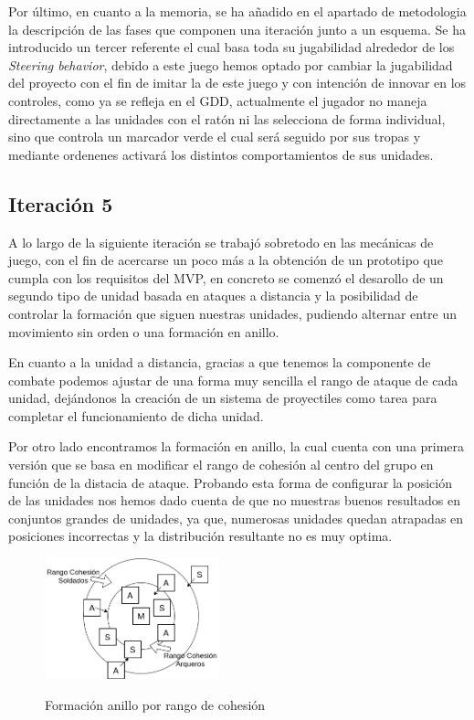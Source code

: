 Por último, en cuanto a la memoria, se ha añadido en el apartado de metodologia la
descripción de las fases que componen una iteración junto a un esquema. Se ha introducido
un tercer referente el cual basa toda su jugabilidad alrededor de los \textit{Steering
behavior}, debido a este juego hemos optado por cambiar la jugabilidad del proyecto
con el fin de imitar la de este juego y con intención de innovar en los controles, como ya se
refleja en el \ac{GDD}, actualmente el jugador no maneja directamente a las unidades con el
ratón ni las selecciona de forma individual, sino que controla un marcador verde el cual será
seguido por sus tropas y mediante ordenenes activará los distintos comportamientos de sus 
unidades. 

\subsection*{Iteración 5}
A lo largo de la siguiente iteración se trabajó sobretodo en las mecánicas de juego, con el fin
de acercarse un poco más a la obtención de un prototipo que cumpla con los requisitos del \acs{MVP},
en concreto se comenzó el desarollo de un segundo tipo de unidad basada en ataques a distancia y 
la posibilidad de controlar la formación que siguen nuestras unidades, pudiendo alternar entre un
movimiento sin orden o una formación en anillo.

En cuanto a la unidad a distancia, gracias a que tenemos la componente de combate podemos ajustar de una
forma muy sencilla el rango de ataque de cada unidad, dejándonos la creación de un sistema de proyectiles
como tarea para completar el funcionamiento de dicha unidad. 

Por otro lado encontramos la formación en anillo, la cual cuenta con una primera versión que se basa en
modificar el rango de cohesión al centro del grupo en función de la distacia de ataque. Probando esta forma 
de configurar la posición de las unidades nos hemos dado cuenta de que no muestras buenos resultados en
conjuntos grandes de unidades, ya que, numerosas unidades quedan atrapadas en posiciones incorrectas y la
distribución resultante no es muy optima.

\begin{figure}[htb]
\centering
\includegraphics[width=0.45\textwidth]{imagenes/diario_desarrollo/anillo1.png}\\
\caption{Formación anillo por rango de cohesión}
\label{fig:anillo1}
\end{figure}

